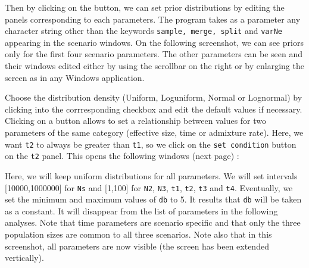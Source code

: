 Then by clicking on the   button, we can set prior distributions by editing the panels corresponding to each parameters. The program takes as a parameter any character string other than the keywords \texttt{sample, merge, split} and \texttt{varNe} appearing in the scenario windows. On the following screenshot, we can see priors only for the first four scenario parameters. The other parameters can be seen and their windows edited either by using the scrollbar on the right or by enlarging the screen as in any Windows application.


Choose the distribution density (Uniform, Loguniform, Normal or Lognormal) by clicking into the corrresponding  checkbox and edit the default values if necessary. Clicking on a   button allows to set a relationship between values for two parameters of the same category (effective size, time or admixture rate). Here, we want \texttt{t2} to always be greater than \texttt{t1}, so we click on the \texttt{set condition} button on the \texttt{t2} panel. This opens the following windows (next page) :

\newpage


Here, we will keep uniform distributions for all parameters. We will set intervals [10000,1000000] for  \texttt{Ns} and [1,100] for  \texttt{N2},  \texttt{N3},  \texttt{t1}, \texttt{t2}, \texttt{t3} and  \texttt{t4}. Eventually, we set
the minimum and maximum values of \texttt{db}  to 5. It results that \texttt{db} will be taken as a constant. It will disappear from the list of parameters in the following analyses. Note that time parameters are scenario specific and that only the three population sizes are common to all three scenarios. Note also that in this screenshot, all parameters are now visible (the screen has been extended vertically).


